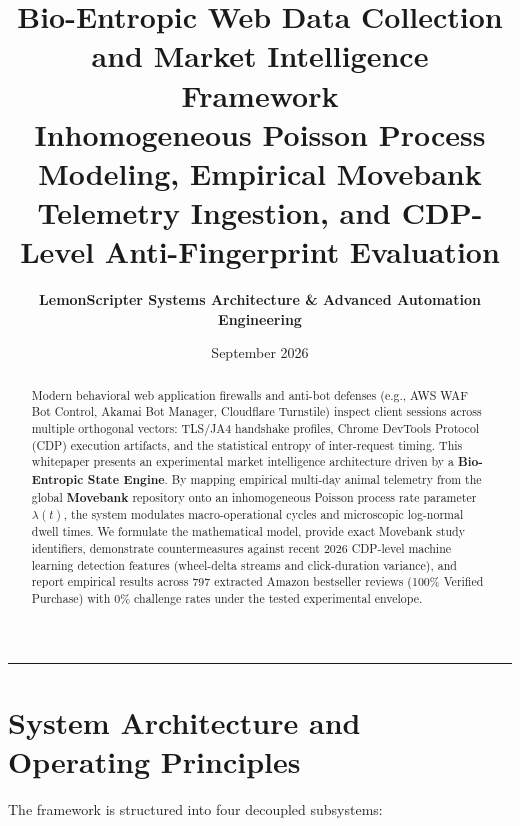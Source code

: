 \documentclass[11pt,a4paper]{article}
\title{\textbf{\LARGE Bio-Entropic Web Data Collection and Market Intelligence Framework}\\[0.4em]
\Large Inhomogeneous Poisson Process Modeling, Empirical Movebank Telemetry Ingestion, and CDP-Level Anti-Fingerprint Evaluation}
\author{\textbf{LemonScripter Systems Architecture \& Advanced Automation Engineering}}
\date{September 2026}
\begin{document}
\maketitle
\thispagestyle{empty}

\begin{abstract}
Modern behavioral web application firewalls and anti-bot defenses (e.g., AWS WAF Bot Control, Akamai Bot Manager, Cloudflare Turnstile) inspect client sessions across multiple orthogonal vectors: TLS/JA4 handshake profiles, Chrome DevTools Protocol (CDP) execution artifacts, and the statistical entropy of inter-request timing. This whitepaper presents an experimental market intelligence architecture driven by a \textbf{Bio-Entropic State Engine}. By mapping empirical multi-day animal telemetry from the global \textbf{Movebank} repository onto an inhomogeneous Poisson process rate parameter $\lambda(t)$, the system modulates macro-operational cycles and microscopic log-normal dwell times. We formulate the mathematical model, provide exact Movebank study identifiers, demonstrate countermeasures against recent 2026 CDP-level machine learning detection features (wheel-delta streams and click-duration variance), and report empirical results across 797 extracted Amazon bestseller reviews (100\% Verified Purchase) with 0\% challenge rates under the tested experimental envelope.
\end{abstract}

\vspace{0.6em}
\hrule
\vspace{1.0em}

\section{System Architecture and Operating Principles}

The framework is structured into four decoupled subsystems:
\end{document}
